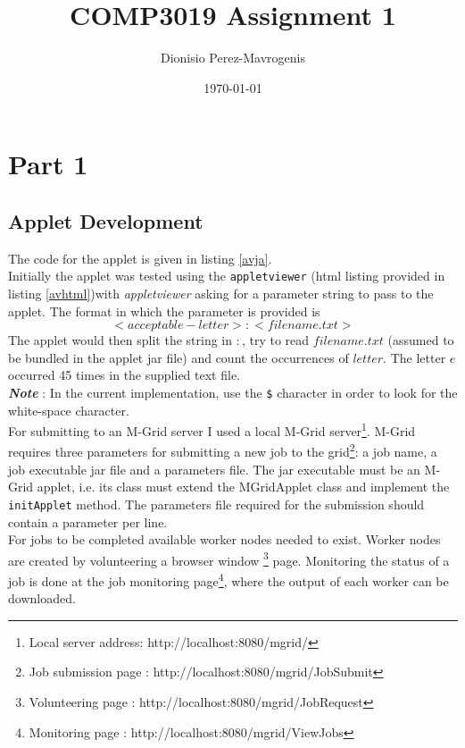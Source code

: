 \documentclass[12pt,a4paper,onecolumn]{article}
\begin{document}
\author{Dionisio Perez-Mavrogenis}
\title{COMP3019 Assignment 1}
\date{\today}
\maketitle

\section{Part 1}
\subsection{Applet Development}
The code for the applet is given in listing \ref{avja}.\\

Initially the applet was tested using the \texttt{appletviewer} (html listing provided in listing \ref{avhtml})with \textit{appletviewer} asking for a parameter string to pass to the applet. The format in which the parameter is provided is
$$ <acceptable-letter>:<filename.txt> $$
The applet would then split the string in $:$, try to read $filename.txt$ (assumed to be bundled in the applet jar file) and count the occurrences of $letter$. The letter $e$ occurred 45 times in the supplied text file.\\

\textbf{\textit{Note}} : In the current implementation, use the \texttt{\$} character in order to look for the white-space character.\\

For submitting to an M-Grid server I used a local M-Grid server\footnote{Local server address: http://localhost:8080/mgrid/}. M-Grid requires three parameters for submitting a new job to the grid\footnote{Job submission page : http://localhost:8080/mgrid/JobSubmit}: a job name, a job executable jar file and a parameters file. The jar executable must be an M-Grid applet, i.e. its class must extend the MGridApplet class and implement the \texttt{initApplet} method. The parameters file required for the submission should contain a parameter per line.\\

For jobs to be completed available worker nodes needed to exist. Worker nodes are created by volunteering a browser window \footnote{Volunteering page : http://localhost:8080/mgrid/JobRequest} page. Monitoring the status of a job is done at the job monitoring page\footnote{Monitoring page : http://localhost:8080/mgrid/ViewJobs}, where the output of each worker can be downloaded.\\
\end{document}

